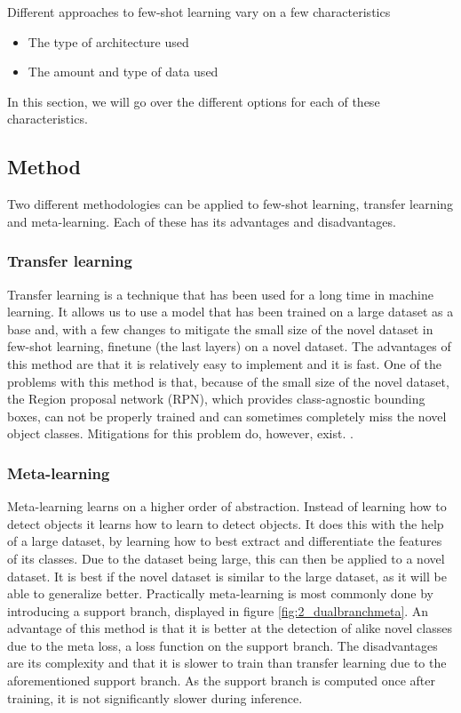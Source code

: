 Different approaches to few-shot learning vary on a few characteristics
\begin{itemize}
	\item The type of architecture used
	\item The amount and type of data used
\end{itemize}

In this section, we will go over the different options for each of these characteristics.

\subsection{Method}

Two different methodologies can be applied to few-shot learning, transfer learning and meta-learning. Each of these has its advantages and disadvantages. %

\subsubsection*{Transfer learning}

Transfer learning is a technique that has been used for a long time in machine learning. It allows us to use a model that has been trained on a large dataset as a base and, with a few changes to mitigate the small size of the novel dataset in few-shot learning, finetune (the last layers) on a novel dataset. The advantages of this method are that it is relatively easy to implement and it is fast. One of the problems with this method is that, because of the small size of the novel dataset, the Region proposal network (RPN), which provides class-agnostic bounding boxes, can not be properly trained and can sometimes completely miss the novel object classes. Mitigations for this problem do, however, exist. \cite{DBLP:journals/corr/abs-2011-10142, VU2022104398, DBLP:journals/corr/abs-2105-09491, DBLP:journals/corr/abs-2103-05950,rs14143255}.

\subsubsection*{Meta-learning}

Meta-learning learns on a higher order of abstraction. Instead of learning how to detect objects it learns how to learn to detect objects. It does this with the help of a large dataset, by learning how to best extract and differentiate the features of its classes. Due to the dataset being large, this can then be applied to a novel dataset. It is best if the novel dataset is similar to the large dataset, as it will be able to generalize better. Practically meta-learning is most commonly done by introducing a support branch\cite{few-shot-comprehensive-survey}, displayed in figure \ref{fig:2_dualbranchmeta}. An advantage of this method is that it is better at the detection of alike novel classes due to the meta loss, a loss function on the support branch. %
The disadvantages are its complexity and that it is slower to train than transfer learning due to the aforementioned support branch. As the support branch is computed once after training, it is not significantly slower during inference.

